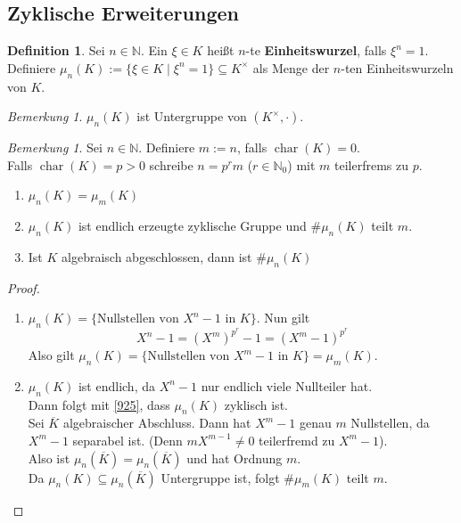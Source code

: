 \documentclass[10pt,a4paper]{article}
\newcommand{\N}{\ensuremath{\mathbb{N}}}
\newcommand{\ol}[1]{\overline{#1}}
\newcommand{\cha}{\ensuremath{\operatorname{char}}}
\newcounter{thm}[section]
\theoremstyle{definition}
\newtheorem{definition}[thm]{Definition}
\theoremstyle{plain}
\theoremstyle{remark}
\newtheorem{bem}[thm]{Bemerkung}
\newtheorem*{bem*}{Bemerkung}
\begin{document}
\subsection{Zyklische Erweiterungen}
\begin{definition}
	Sei $n\in \N$. Ein $\xi\in K$ heißt $n$-te \textbf{Einheitswurzel}, falls $\xi^n=1$.
	Definiere $\mu_{n}(K):=\{\xi\in K\mid \xi^n=1\}\subseteq K^\times$ als Menge der $n$-ten Einheitswurzeln von $K$.
\end{definition}
\begin{bem*}
	$\mu_{n}(K)$ ist Untergruppe von $(K^\times,\cdot)$.
\end{bem*}

\begin{bem}
	Sei $n\in \N$. Definiere $m:=n$, falls $\cha(K)=0$.\\
	Falls $\cha(K)=p>0$ schreibe $n=p^rm$ ($r\in\N_0$) mit $m$ teilerfrems zu $p$.
	\begin{enumerate}
		\item $\mu_n(K)=\mu_m(K)$
		\item $\mu_n(K)$ ist endlich erzeugte zyklische Gruppe und $\#\mu_n(K)$ teilt $m$.
		\item Ist $K$ algebraisch abgeschlossen, dann ist $\#\mu_n(K)$
	\end{enumerate}
\end{bem}
\begin{proof}
	\begin{enumerate}
		\item $\mu_n(K)=\{\text{Nullstellen von $X^n-1$ in $K$}\}$. Nun gilt
		\[X^n-1=(X^m)^{p^r}-1=(X^m-1)^{p^r}\]
		Also gilt $\mu_n(K)=\{\text{Nullstellen von $X^m-1$ in $K$}\}=\mu_m(K)$.
		\item $\mu_n(K)$ ist endlich, da $X^n-1$ nur endlich viele Nullteiler hat.\\
		Dann folgt mit \ref{925}, dass $\mu_n(K)$ zyklisch ist.\\
		Sei $\ol K$ algebraischer Abschluss. Dann hat $X^m-1$ genau $m$ Nullstellen, da $X^m-1$ separabel ist.
		(Denn $mX^{m-1}\neq 0$ teilerfremd zu $X^m-1$).\\
		Also ist $\mu_n(\ol K)=\mu_n(\ol K)$ und hat Ordnung $m$.\\
		Da $\mu_n(K)\subseteq \mu_n(\ol K)$ Untergruppe ist, folgt $\#\mu_m(K)$ teilt $m$.
	\end{enumerate}
\end{proof}
\end{document}

